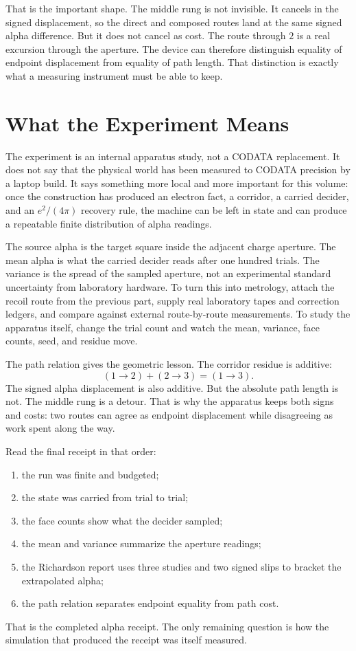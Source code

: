 That is the important shape. The middle rung is not invisible. It cancels in the signed displacement, so the
direct and composed routes land at the same signed alpha difference. But it does not cancel as cost. The route
through \(2\) is a real excursion through the aperture. The device can therefore distinguish equality of endpoint
displacement from equality of path length. That distinction is exactly what a measuring instrument must be able
to keep.

\section{What the Experiment Means}

The experiment is an internal apparatus study, not a CODATA replacement. It does not say that the physical world
has been measured to CODATA precision by a laptop build. It says something more local and more important for this
volume: once the construction has produced an electron fact, a corridor, a carried decider, and an
\(e^2/(4\pi)\) recovery rule, the machine can be left in state and can produce a repeatable finite distribution
of alpha readings.

The source alpha is the target square inside the adjacent charge aperture. The mean alpha is what the carried
decider reads after one hundred trials. The variance is the spread of the sampled aperture, not an experimental
standard uncertainty from laboratory hardware. To turn this into metrology, attach the recoil route from the
previous part, supply real laboratory tapes and correction ledgers, and compare against external route-by-route
measurements. To study the apparatus itself, change the trial count and watch the mean, variance, face counts,
seed, and residue move.

The path relation gives the geometric lesson. The corridor residue is additive:
\[
  (1\to2)+(2\to3) = (1\to3).
\]
The signed alpha displacement is also additive. But the absolute path length is not. The middle rung is a
detour. That is why the apparatus keeps both signs and costs: two routes can agree as endpoint displacement
while disagreeing as work spent along the way.

Read the final receipt in that order:
\begin{enumerate}
\item the run was finite and budgeted;
\item the state was carried from trial to trial;
\item the face counts show what the decider sampled;
\item the mean and variance summarize the aperture readings;
\item the Richardson report uses three studies and two signed slips to bracket the extrapolated alpha;
\item the path relation separates endpoint equality from path cost.
\end{enumerate}
That is the completed alpha receipt. The only remaining question is how the simulation that produced the receipt
was itself measured.

